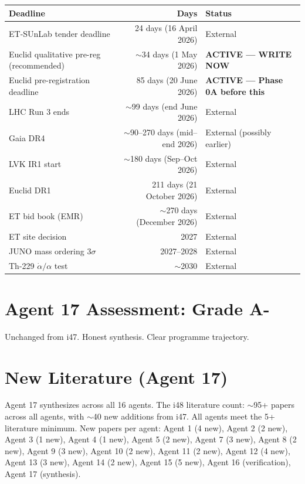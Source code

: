 \documentclass[11pt,a4paper]{article}
\begin{document}
\begin{center}
\begin{tabular}{lrl}
\toprule
\textbf{Deadline} & \textbf{Days} & \textbf{Status} \\
\midrule
ET-SUnLab tender deadline & 24 days (16 April 2026) & External \\
Euclid qualitative pre-reg (recommended) & $\sim$34 days (1 May 2026) & \textbf{ACTIVE --- WRITE NOW} \\
Euclid pre-registration deadline & 85 days (20 June 2026) & \textbf{ACTIVE --- Phase 0A before this} \\
LHC Run 3 ends & $\sim$99 days (end June 2026) & External \\
Gaia DR4 & $\sim$90--270 days (mid--end 2026) & External (possibly earlier) \\
LVK IR1 start & $\sim$180 days (Sep--Oct 2026) & External \\
Euclid DR1 & 211 days (21 October 2026) & External \\
ET bid book (EMR) & $\sim$270 days (December 2026) & External \\
ET site decision & 2027 & External \\
JUNO mass ordering $3\sigma$ & 2027--2028 & External \\
Th-229 $\dot{\alpha}/\alpha$ test & $\sim$2030 & External \\
\bottomrule
\end{tabular}
\end{center}

\section{Agent 17 Assessment: Grade A-}

Unchanged from i47. Honest synthesis. Clear programme trajectory.

\section{New Literature (Agent 17)}

Agent 17 synthesizes across all 16 agents. The i48 literature count: $\sim$95+ papers across all agents, with $\sim$40 new additions from i47. All agents meet the 5+ literature minimum. New papers per agent: Agent 1 (4 new), Agent 2 (2 new), Agent 3 (1 new), Agent 4 (1 new), Agent 5 (2 new), Agent 7 (3 new), Agent 8 (2 new), Agent 9 (3 new), Agent 10 (2 new), Agent 11 (2 new), Agent 12 (4 new), Agent 13 (3 new), Agent 14 (2 new), Agent 15 (5 new), Agent 16 (verification), Agent 17 (synthesis).
\end{document}
